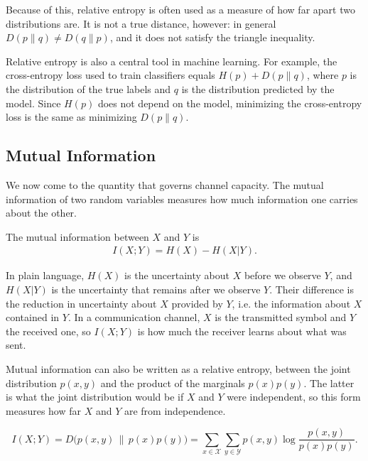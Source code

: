 Because of this, relative entropy is often used as a measure of how far apart two distributions are. It is not a true distance, however: in general \(D(p\|q) \neq D(q\|p)\), and it does not satisfy the triangle inequality.

Relative entropy is also a central tool in machine learning. For example, the cross-entropy loss used to train classifiers equals \(H(p) + D(p\|q)\), where \(p\) is the distribution of the true labels and \(q\) is the distribution predicted by the model. Since \(H(p)\) does not depend on the model, minimizing the cross-entropy loss is the same as minimizing \(D(p\|q)\).

\subsection{Mutual Information}
We now come to the quantity that governs channel capacity. The mutual information of two random variables measures how much information one carries about the other.

\begin{definition}
The mutual information between \(X\) and \(Y\) is
\begin{align}
I(X;Y) = H(X) - H(X|Y).\label{eq:MI}
\end{align}
\end{definition}

In plain language, \(H(X)\) is the uncertainty about \(X\) before we observe \(Y\), and \(H(X|Y)\) is the uncertainty that remains after we observe \(Y\). Their difference is the reduction in uncertainty about \(X\) provided by \(Y\), i.e. the information about \(X\) contained in \(Y\). In a communication channel, \(X\) is the transmitted symbol and \(Y\) the received one, so \(I(X;Y)\) is how much the receiver learns about what was sent.

Mutual information can also be written as a relative entropy, between the joint distribution \(p(x,y)\) and the product of the marginals \(p(x)p(y)\). The latter is what the joint distribution would be if \(X\) and \(Y\) were independent, so this form measures how far \(X\) and \(Y\) are from independence.

\begin{proposition}\label{prop:MI_KL}
\begin{equation*}
    I(X;Y) = D\big(p(x,y)\,\|\,p(x)p(y)\big) = \sum_{x\in\mathcal{X}}\sum_{y\in \mathcal{Y}} p(x,y) \log \frac{p(x,y)}{p(x)p(y)}.
\end{equation*}
\end{proposition}

